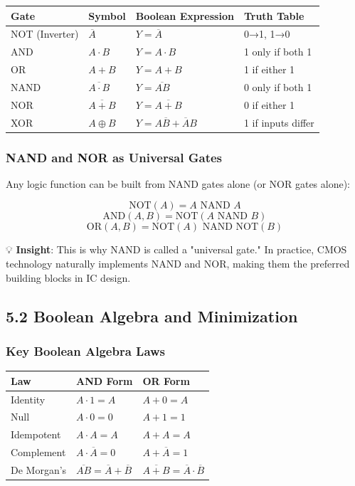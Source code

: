 \documentclass[11pt,a4paper]{book}
\begin{document}
\begin{center}
\begin{tabular}{|l|l|l|l|}
\hline
Gate & Symbol & Boolean Expression & Truth Table \\
\hline
NOT (Inverter) & $\overline{A}$ & $Y = \overline{A}$ & 0→1, 1→0 \\
AND & $A \cdot B$ & $Y = A \cdot B$ & 1 only if both 1 \\
OR & $A + B$ & $Y = A + B$ & 1 if either 1 \\
NAND & $\overline{A \cdot B}$ & $Y = \overline{AB}$ & 0 only if both 1 \\
NOR & $\overline{A + B}$ & $Y = \overline{A+B}$ & 0 if either 1 \\
XOR & $A \oplus B$ & $Y = A\overline{B} + \overline{A}B$ & 1 if inputs differ \\
\hline
\end{tabular}
\end{center}

\subsubsection{NAND and NOR as Universal Gates}

Any logic function can be built from NAND gates alone (or NOR gates alone):

\[\text{NOT}(A) = A \text{ NAND } A\]
\[\text{AND}(A,B) = \text{NOT}(A \text{ NAND } B)\]
\[\text{OR}(A,B) = \text{NOT}(A) \text{ NAND } \text{NOT}(B)\]

💡 \textbf{Insight}: This is why NAND is called a "universal gate." In practice, CMOS technology naturally implements NAND and NOR, making them the preferred building blocks in IC design.

\medskip\noindent\hrulefill\medskip

\subsection{5.2 Boolean Algebra and Minimization}

\subsubsection{Key Boolean Algebra Laws}

\begin{center}
\begin{tabular}{|l|l|l|}
\hline
Law & AND Form & OR Form \\
\hline
Identity & $A \cdot 1 = A$ & $A + 0 = A$ \\
Null & $A \cdot 0 = 0$ & $A + 1 = 1$ \\
Idempotent & $A \cdot A = A$ & $A + A = A$ \\
Complement & $A \cdot \overline{A} = 0$ & $A + \overline{A} = 1$ \\
De Morgan's & $\overline{AB} = \overline{A} + \overline{B}$ & $\overline{A+B} = \overline{A} \cdot \overline{B}$ \\
\hline
\end{tabular}
\end{center}
\end{document}

